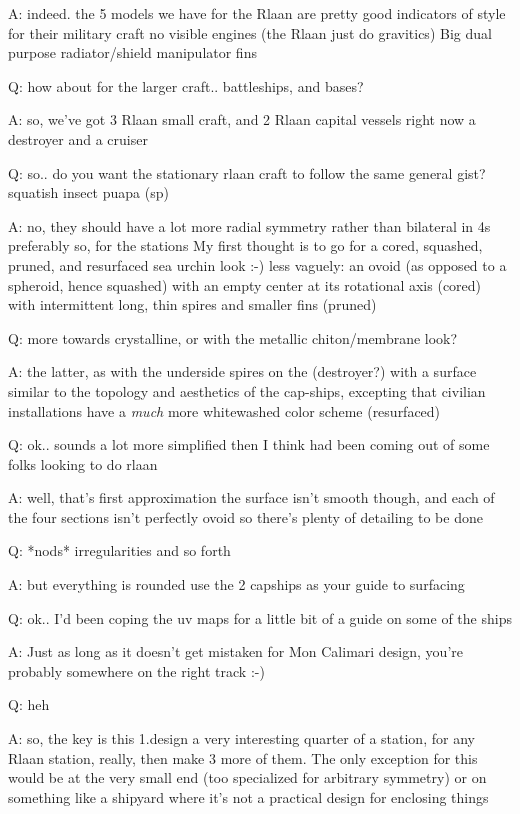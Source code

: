 A: indeed.  the 5 models we have for the Rlaan are pretty good
indicators of style for their military craft no visible engines (the
Rlaan just do gravitics) Big dual purpose radiator/shield manipulator
fins

Q: how about for the larger craft.. battleships, and bases?

A: so, we've got 3 Rlaan small craft, and 2 Rlaan capital vessels
 right now a destroyer and a cruiser

Q: so.. do you want the stationary rlaan craft to follow the same
general gist? squatish insect puapa (sp)

A: no, they should have a lot more radial symmetry rather than
bilateral in 4s preferably so, for the stations My first thought is to
go for a cored, squashed, pruned, and resurfaced sea urchin look :-)
less vaguely: an ovoid (as opposed to a spheroid, hence squashed) with
an empty center at its rotational axis (cored) with intermittent long,
thin spires and smaller fins (pruned)

Q: more towards crystalline, or with the metallic chiton/membrane
look?

A: the latter, as with the underside spires on the (destroyer?) with a
surface similar to the topology and aesthetics of the cap-ships,
excepting that civilian installations have a {\em much} more
whitewashed color scheme (resurfaced)

Q: ok.. sounds a lot more simplified then I think had been coming out
of some folks looking to do rlaan

A: well, that's first approximation the surface isn't smooth though,
and each of the four sections isn't perfectly ovoid so there's plenty
of detailing to be done

Q: *nods* irregularities and so forth

A: but everything is rounded use the 2 capships as your guide to
surfacing

Q: ok.. I'd been coping the uv maps for a little bit of a guide on
some of the ships

A: Just as long as it doesn't get mistaken for Mon Calimari design,
you're probably somewhere on the right track :-)

Q: heh

A: so, the key is this 1.design a very interesting quarter of a
station, for any Rlaan station, really, then make 3 more of them.  The
only exception for this would be at the very small end (too
specialized for arbitrary symmetry) or on something like a shipyard
where it's not a practical design for enclosing things

